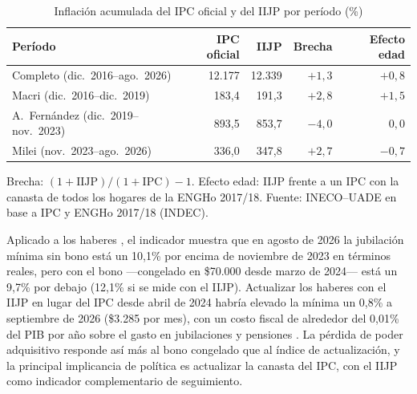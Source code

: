 \begin{table}[!htb]
\centering
\small
\caption{Inflación acumulada del IPC oficial y del IIJP por período (\%)}
\vspace{.25 cm}
\label{tab:iijp_periodos}
\begin{tabular}{@{}l r r r r@{}}
\toprule
Período & IPC oficial & IIJP & Brecha & Efecto edad \\
\midrule
Completo (dic.\ 2016--ago.\ 2026)    & 12.177 & 12.339 & $+1{,}3$ & $+0{,}8$ \\
Macri (dic.\ 2016--dic.\ 2019)        & 183,4  & 191,3  & $+2{,}8$ & $+1{,}5$ \\
A.~Fernández (dic.\ 2019--nov.\ 2023) & 893,5  & 853,7  & $-4{,}0$ & $0{,}0$ \\
Milei (nov.\ 2023--ago.\ 2026)        & 336,0  & 347,8  & $+2{,}7$ & $-0{,}7$ \\
\bottomrule
\end{tabular}

\smallskip
\parbox{12.5cm}{\footnotesize Brecha: $(1+\text{IIJP})/(1+\text{IPC})-1$. Efecto edad: IIJP frente a un IPC con la canasta de todos los hogares de la ENGHo 2017/18. Fuente: INECO--UADE en base a IPC y ENGHo 2017/18 (INDEC).}
\end{table}

Aplicado a los haberes \cite{haber_minimo}, el indicador muestra que en agosto de 2026 la jubilación mínima sin bono está un 10,1\% por encima de noviembre de 2023 en términos reales, pero con el bono ---congelado en \$70.000 desde marzo de 2024--- está un 9,7\% por debajo (12,1\% si se mide con el IIJP). Actualizar los haberes con el IIJP en lugar del IPC desde abril de 2024 habría elevado la mínima un 0,8\% a septiembre de 2026 (\$3.285 por mes), con un costo fiscal de alrededor del 0,01\% del PIB por año sobre el gasto en jubilaciones y pensiones \cite{mecon_imig}. La pérdida de poder adquisitivo responde así más al bono congelado que al índice de actualización, y la principal implicancia de política es actualizar la canasta del IPC, con el IIJP como indicador complementario de seguimiento.

%
%
%
